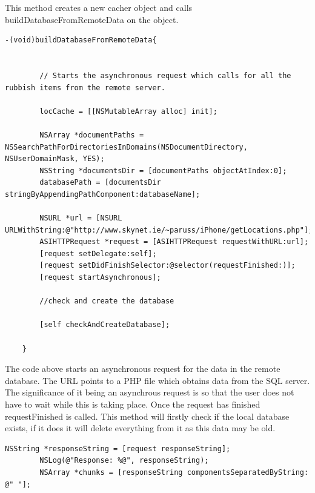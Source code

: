 \documentclass[12pt]{article}
\begin{document}
This method creates a new cacher object and calls buildDatabaseFromRemoteData on the object. 
\begin{verbatim}
-(void)buildDatabaseFromRemoteData{
	
		
		// Starts the asynchronous request which calls for all the rubbish items from the remote server.
	
		locCache = [[NSMutableArray alloc] init];
		
	    NSArray *documentPaths = NSSearchPathForDirectoriesInDomains(NSDocumentDirectory, NSUserDomainMask, YES);
	    NSString *documentsDir = [documentPaths objectAtIndex:0];
	    databasePath = [documentsDir stringByAppendingPathComponent:databaseName];
	
		NSURL *url = [NSURL URLWithString:@"http://www.skynet.ie/~paruss/iPhone/getLocations.php"];
		ASIHTTPRequest *request = [ASIHTTPRequest requestWithURL:url];
		[request setDelegate:self];
		[request setDidFinishSelector:@selector(requestFinished:)];
		[request startAsynchronous];
		
		//check and create the database 
	
		[self checkAndCreateDatabase];
		
	}
\end{verbatim}

The code above starts an asynchronous request for the data in the remote database. The URL points to a PHP file which obtains data from the SQL server. The significance of it being an asynchrous request is so that the user does not have to wait while this is taking place. Once the request has finished requestFinished is called. This method will firstly check if the local database exists, if it does it will delete everything from it as this data may be old.
\begin{verbatim}
NSString *responseString = [request responseString];
		NSLog(@"Response: %@", responseString);
		NSArray *chunks = [responseString componentsSeparatedByString: @" "];
\end{verbatim}
\end{document}

